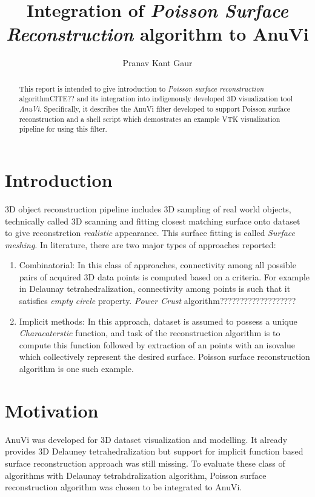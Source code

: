 \documentclass{article}
\begin{document}
\title{Integration of \textit{Poisson Surface Reconstruction} algorithm to AnuVi} 
\author{Pranav Kant Gaur}
\maketitle

\begin{abstract}
This report is intended to give introduction to \textit{Poisson surface reconstruction} algorithm{CITE??} and its integration into indigenously developed 3D visualization tool \textit{AnuVi}. Specifically, it describes the AnuVi filter developed to support Poisson surface reconstruction and a shell script which demostrates an example VTK visualization pipeline for using this filter.
\end{abstract}


\section{Introduction}
3D object reconstruction pipeline includes 3D sampling of real world objects, technically called 3D scanning and fitting closest matching surface onto dataset to give reconstrction \textit{realistic} appearance. This surface fitting is called \textit{Surface meshing}. In literature, there are two major types of approaches reported: 
\begin{enumerate}
\item Combinatorial: In this class of approaches, connectivity among all possible pairs of acquired 3D data points is computed based on a criteria. For example in Delaunay tetrahedralization, connectivity among points is such that it satisfies \textit{empty circle} property. \textit{Power Crust} algorithm???????????????????

\item Implicit methods: In this approach, dataset is assumed to possess a unique \textit{Characaterstic} function, and task of the reconstruction algorithm is to compute this function followed by extraction of an points with an isovalue which collectively represent the desired surface. Poisson surface reconstruction algorithm is one such example.
\end{enumerate} 

\section{Motivation}
AnuVi was developed for 3D dataset visualization and modelling. It already provides 3D Delauney tetrahedralization but support for implicit function based surface reconstruction approach was still missing. To evaluate these class of algorithms with Delaunay tetrahdralization algorithm, Poisson surface reconstruction algorithm was chosen to be integrated to AnuVi. 
\end{document}
